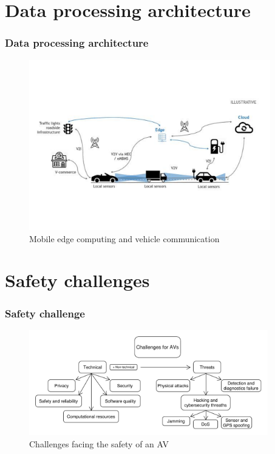 \documentclass[xcolor=dvipsnames]{beamer}
\begin{document}

\section{Data processing architecture}

\begin{frame}[fragile=singleslide]\frametitle{\bf{Data processing architecture}} 
\centering
    \begin{figure}
    \centering
    \caption{Mobile edge computing and vehicle communication\footnotemark}
    \vspace*{-1.85cm}
    \includegraphics[width=10.5cm]{Edgecomputing.pdf}
    \end{figure}

\end{frame}


\section{Safety challenges}

\begin{frame}[fragile=singleslide]\frametitle{\bf{Safety challenge}}
\centering
    \begin{figure}
    \vspace*{-.5cm}
    \caption{Challenges facing the safety of an AV}
    \hspace*{-.5cm}
    \includegraphics[width=10.4cm]{challenges.pdf}

    \end{figure}
\end{frame}
\end{document}
